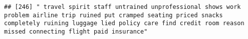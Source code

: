 \documentclass[
]{article}
\begin{document}
\begin{verbatim}
## [246] " travel spirit staff untrained unprofessional shows work problem airline trip ruined put cramped seating priced snacks completely ruining luggage lied policy care find credit room reason missed connecting flight paid insurance"                                                                                                                                                                                                                                                                                                                                                                                                                                                                                                                                                                                                                                                                                                                                                                                                                                                                                                                                                                                                                                                                                                                                                                                                                                                                                                                                                                                                                                                                                                                                                            

\end{verbatim}
\end{document}
